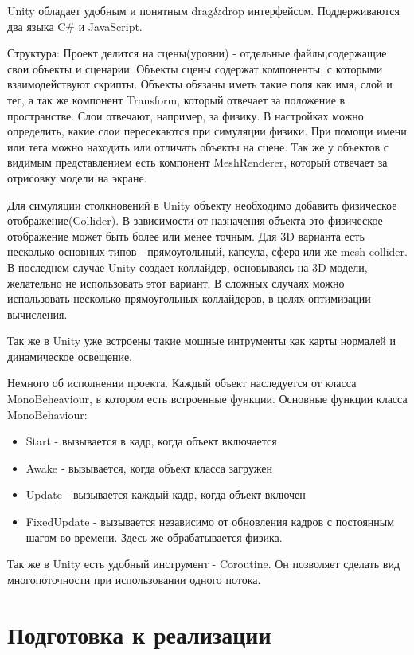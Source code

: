 \documentclass[14pt, titlepage,fleqn,a4paper]{extarticle}
\begin{document}
Unity обладает удобным и понятным drag\&drop интерфейсом. Поддерживаются два языка C\# и JavaScript.

Структура:
	Проект делится на сцены(уровни) - отдельные файлы,содержащие свои объекты и сценарии.
	Объекты сцены содержат компоненты, с которыми взаимодействуют скрипты. Объекты обязаны иметь такие поля как имя, слой и тег, а так же компонент Transform, который отвечает за положение в пространстве. Слои отвечают, например, за физику. В настройках можно определить, какие слои пересекаются при симуляции физики. При помощи имени или тега можно находить или отличать объекты на сцене. Так же у объектов с видимым представлением есть компонент MeshRenderer, который отвечает за отрисовку модели на экране.

	Для симуляции столкновений в Unity объекту необходимо добавить физическое отображение(Collider). В зависимости от назначения объекта это физическое отображение может быть более или менее точным. Для 3D варианта есть несколько основных типов - прямоугольный, капсула, сфера или же mesh collider. В последнем случае Unity  создает коллайдер, основываясь на 3D модели, желательно не использовать этот вариант. В сложных случаях можно использовать несколько прямоугольных коллайдеров, в целях оптимизации вычисления.

Так же в Unity уже встроены такие мощные интрументы как карты нормалей и динамическое освещение.

Немного об исполнении проекта.
Каждый объект наследуется от класса MonoBeheaviour, в котором есть встроенные функции.
	Основные функции класса MonoBehaviour:
	\begin{itemize}
	\item Start - вызывается в кадр, когда объект включается 
	\item Awake - вызывается, когда объект класса загружен
	\item Update - вызывается каждый кадр, когда объект включен
	\item FixedUpdate - вызывается независимо от обновления кадров с постоянным шагом во времени. Здесь же обрабатывается физика.
    \end{itemize}
Так же в Unity есть удобный инструмент - Coroutine. Он позволяет сделать вид многопоточности при использовании одного потока.

    \section*{Подготовка к реализации}
	
\end{document}
